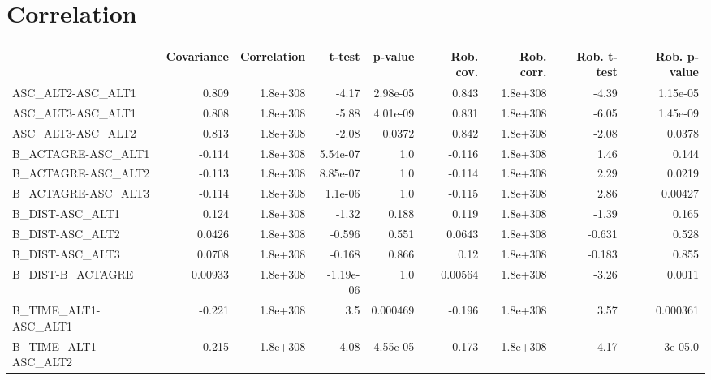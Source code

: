 \section{Correlation}
\begin{tabular}{lrrrrrrrr}
\toprule
{} &  Covariance &  Correlation &    t-test &  p-value &  Rob. cov. &  Rob. corr. &  Rob. t-test &  Rob. p-value \\
\midrule
ASC\_ALT2-ASC\_ALT1                 &       0.809 &     1.8e+308 &     -4.17 & 2.98e-05 &      0.843 &    1.8e+308 &        -4.39 &      1.15e-05 \\
ASC\_ALT3-ASC\_ALT1                 &       0.808 &     1.8e+308 &     -5.88 & 4.01e-09 &      0.831 &    1.8e+308 &        -6.05 &      1.45e-09 \\
ASC\_ALT3-ASC\_ALT2                 &       0.813 &     1.8e+308 &     -2.08 &   0.0372 &      0.842 &    1.8e+308 &        -2.08 &        0.0378 \\
B\_ACTAGRE-ASC\_ALT1                &      -0.114 &     1.8e+308 &  5.54e-07 &      1.0 &     -0.116 &    1.8e+308 &         1.46 &         0.144 \\
B\_ACTAGRE-ASC\_ALT2                &      -0.113 &     1.8e+308 &  8.85e-07 &      1.0 &     -0.114 &    1.8e+308 &         2.29 &        0.0219 \\
B\_ACTAGRE-ASC\_ALT3                &      -0.114 &     1.8e+308 &   1.1e-06 &      1.0 &     -0.115 &    1.8e+308 &         2.86 &       0.00427 \\
B\_DIST-ASC\_ALT1                   &       0.124 &     1.8e+308 &     -1.32 &    0.188 &      0.119 &    1.8e+308 &        -1.39 &         0.165 \\
B\_DIST-ASC\_ALT2                   &      0.0426 &     1.8e+308 &    -0.596 &    0.551 &     0.0643 &    1.8e+308 &       -0.631 &         0.528 \\
B\_DIST-ASC\_ALT3                   &      0.0708 &     1.8e+308 &    -0.168 &    0.866 &       0.12 &    1.8e+308 &       -0.183 &         0.855 \\
B\_DIST-B\_ACTAGRE                  &     0.00933 &     1.8e+308 & -1.19e-06 &      1.0 &    0.00564 &    1.8e+308 &        -3.26 &        0.0011 \\
B\_TIME\_ALT1-ASC\_ALT1              &      -0.221 &     1.8e+308 &       3.5 & 0.000469 &     -0.196 &    1.8e+308 &         3.57 &      0.000361 \\
B\_TIME\_ALT1-ASC\_ALT2              &      -0.215 &     1.8e+308 &      4.08 & 4.55e-05 &     -0.173 &    1.8e+308 &         4.17 &       3e-05.0 \\

\end{tabular}

